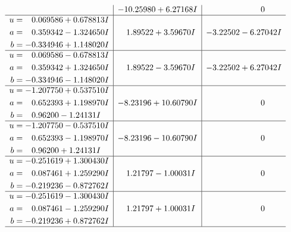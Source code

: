 \documentclass[1p]{elsarticle_modified}
\theoremstyle{definition}
\begin{document}
$$\begin{array}{c|c|c}
 & -10.25980 + 6.27168 I & \phantom{-0.000000 } 0 \\ \hline\begin{aligned}
u &= \phantom{-}0.069586 + 0.678813 I \\
a &= \phantom{-}0.359342 - 1.324650 I \\
b &= -0.334946 + 1.148020 I\end{aligned}
 & \phantom{-}1.89522 + 3.59670 I & -3.22502 - 6.27042 I \\ \hline\begin{aligned}
u &= \phantom{-}0.069586 - 0.678813 I \\
a &= \phantom{-}0.359342 + 1.324650 I \\
b &= -0.334946 - 1.148020 I\end{aligned}
 & \phantom{-}1.89522 - 3.59670 I & -3.22502 + 6.27042 I \\ \hline\begin{aligned}
u &= -1.207750 + 0.537510 I \\
a &= \phantom{-}0.652393 + 1.198970 I \\
b &= \phantom{-}0.96200 - 1.24131 I\end{aligned}
 & -8.23196 + 10.60790 I & \phantom{-0.000000 } 0 \\ \hline\begin{aligned}
u &= -1.207750 - 0.537510 I \\
a &= \phantom{-}0.652393 - 1.198970 I \\
b &= \phantom{-}0.96200 + 1.24131 I\end{aligned}
 & -8.23196 - 10.60790 I & \phantom{-0.000000 } 0 \\ \hline\begin{aligned}
u &= -0.251619 + 1.300430 I \\
a &= \phantom{-}0.087461 + 1.259290 I \\
b &= -0.219236 - 0.872762 I\end{aligned}
 & \phantom{-}1.21797 - 1.00031 I & \phantom{-0.000000 } 0 \\ \hline\begin{aligned}
u &= -0.251619 - 1.300430 I \\
a &= \phantom{-}0.087461 - 1.259290 I \\
b &= -0.219236 + 0.872762 I\end{aligned}
 & \phantom{-}1.21797 + 1.00031 I & \phantom{-0.000000 } 0\\
 \hline 
 \end{array}$$\newpage$$\begin{array}{c|c|c}  

\end{array}$$
\end{document}
